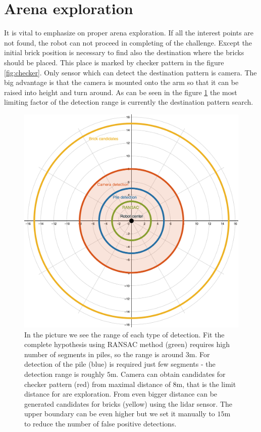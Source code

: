 \section{Arena exploration}
It is vital to emphasize on proper arena exploration. If all the interest points are not found, the robot can not proceed in completing of the challenge. Except the initial brick position is necessary to find also the destination where the bricks should be placed. This place is marked by checker pattern in the figure \ref{fig:checker}. Only sensor which can detect the destination pattern is camera. The big advantage is that the camera is mounted onto the arm so that it can be raised into height and turn around. As can be seen in the figure \ref{fig:detection_range} the most limiting factor of the detection range is currently the destination pattern search.

\begin{figure}[H]
	\centering
	\includegraphics[scale=0.38]{fig/detection_range.png}
	\caption[Detection ranges]{In the picture we see the range of each type of detection. Fit the complete hypothesis using RANSAC method (green) requires high number of segments in piles, so the range is around $3$m. For detection of the pile (blue) is required just few segments - the detection range is roughly $5$m. Camera can obtain candidates for checker pattern (red) from maximal distance of $8$m, that is the limit distance for are exploration. From even bigger distance can be generated candidates for bricks (yellow) using the lidar sensor. The upper boundary can be even higher but we set it manually to $15$m to reduce the number of false positive detections.}
	\label{fig:detection_range}
\end{figure}

